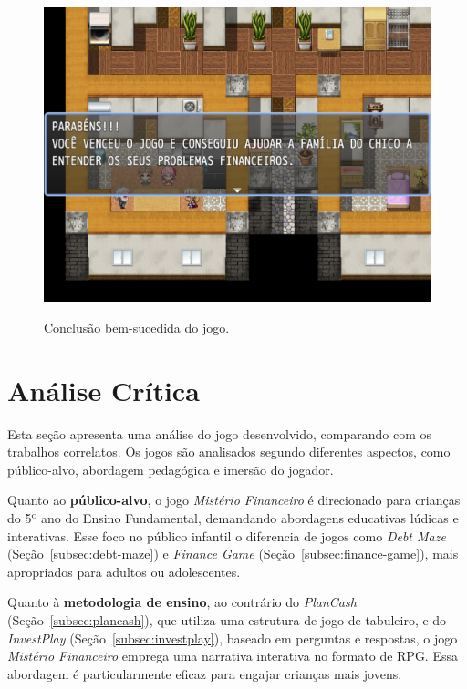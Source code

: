 \begin{figure}[!htbp]
	\centering
	\caption{Conclusão bem-sucedida do jogo.}
	\includegraphics[scale=0.4]{Textuais/Pictures/vitoria.png}
	\label{fig:vitoria}
\end{figure}

\section{Análise Crítica}

Esta seção apresenta uma análise do jogo desenvolvido, comparando com os trabalhos correlatos. Os jogos são analisados segundo diferentes aspectos, como público-alvo, abordagem pedagógica e imersão do jogador.

Quanto ao \textbf{público-alvo}, o jogo \textit{Mistério Financeiro} é direcionado para crianças do 5º ano do Ensino Fundamental, demandando abordagens educativas lúdicas e interativas. Esse foco no público infantil o diferencia de jogos como \textit{Debt Maze} (Seção~\ref{subsec:debt-maze}) e \textit{Finance Game} (Seção~\ref{subsec:finance-game}), mais apropriados para adultos ou adolescentes.

Quanto à \textbf{metodologia de ensino}, ao contrário do \textit{PlanCash} (Seção~\ref{subsec:plancash}), que utiliza uma estrutura de jogo de tabuleiro, e do \textit{InvestPlay} (Seção~\ref{subsec:investplay}), baseado em perguntas e respostas, o jogo \textit{Mistério Financeiro} emprega uma narrativa interativa no formato de RPG. Essa abordagem é particularmente eficaz para engajar crianças mais jovens.

